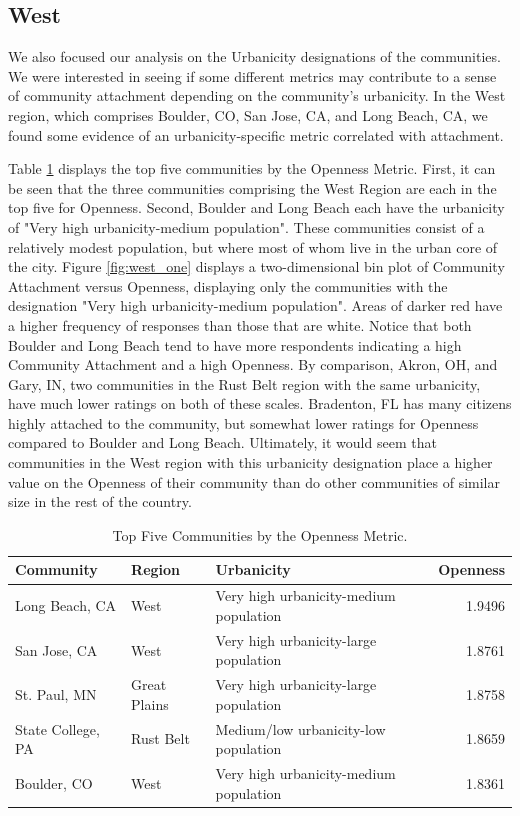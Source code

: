 \documentclass[11pt]{article}\usepackage{knitr}
\begin{document}
\subsection{West}
We also focused our analysis on the Urbanicity designations of the communities. We were interested in seeing if some different metrics may contribute to a sense of community attachment depending on the community's urbanicity. In the West region, which comprises Boulder, CO, San Jose, CA, and Long Beach, CA, we found some evidence of an urbanicity-specific metric correlated with attachment.

Table \ref{tbl:open_table} displays the top five communities by the Openness Metric. First, it can be seen that the three communities comprising the West Region are each in the top five for Openness. Second, Boulder and Long Beach each have the urbanicity of "Very high urbanicity-medium population". These communities consist of a relatively modest population, but where most of whom live in the urban core of the city. Figure \ref{fig:west_one} displays a two-dimensional bin plot of Community Attachment versus Openness, displaying only the communities with the designation "Very high urbanicity-medium population". Areas of darker red have a higher frequency of responses than those that are white. Notice that both Boulder and Long Beach tend to have more respondents indicating a high Community Attachment and a high Openness. By comparison, Akron, OH, and Gary, IN, two communities in the Rust Belt region with the same urbanicity, have much lower ratings on both of these scales. Bradenton, FL has many citizens highly attached to the community, but somewhat lower ratings for Openness compared to Boulder and Long Beach. Ultimately, it would seem that communities in the West region with this urbanicity designation place a higher value on the Openness of their community than do other communities of similar size in the rest of the country.

\begin{table}[ht]
\centering
\begin{tabular}{lllr}
  \hline
Community & Region & Urbanicity & Openness \\ 
  \hline
Long Beach, CA & West & Very high urbanicity-medium population & 1.9496 \\ 
  San Jose, CA & West & Very high urbanicity-large population & 1.8761 \\ 
  St. Paul, MN & Great Plains & Very high urbanicity-large population & 1.8758 \\ 
  State College, PA & Rust Belt & Medium/low urbanicity-low population & 1.8659 \\ 
  Boulder, CO & West & Very high urbanicity-medium population & 1.8361 \\ 
   \hline
\end{tabular}
\caption{Top Five Communities by the Openness Metric.} 
\label{tbl:open_table}
\end{table}
\end{document}
